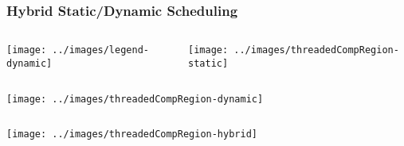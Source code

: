 \begin{frame}[label=hybridstatdyn]
\frametitle{Hybrid Static/Dynamic Scheduling}
\begin{columns}
  
  \texttt{[image: ../images/legend-dynamic]}\\
  \begin{center}
    \texttt{[image: ../images/threadedCompRegion-static]} \\
  \end{center} 
\end{columns}
\begin{columns}

  \begin{center}
    \texttt{[image: ../images/threadedCompRegion-dynamic]}\\
  \end{center}
\end{columns}

\begin{columns}

\begin{center}
\texttt{[image: ../images/threadedCompRegion-hybrid]}
\end{center}
\end{columns}
\end{frame}


